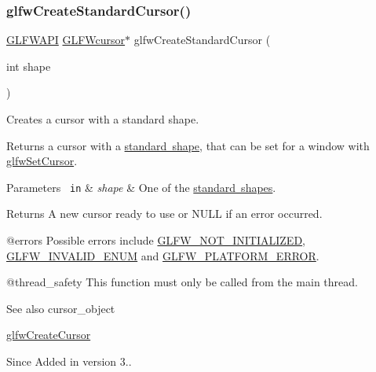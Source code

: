 \subsubsection{\texorpdfstring{glfwCreateStandardCursor()}{glfwCreateStandardCursor()}}
{\footnotesize\ttfamily \mbox{\hyperlink{glfw3_8h_a56da5036b2cc259351ae22fd6439bb47}{G\+L\+F\+W\+A\+PI}} \mbox{\hyperlink{glfw3_8h_a89261ae18c75e863aaf2656ecdd238f4}{G\+L\+F\+Wcursor}}$\ast$ glfw\+Create\+Standard\+Cursor (\begin{DoxyParamCaption}\item[{int}]{shape }\end{DoxyParamCaption})}



Creates a cursor with a standard shape. 

Returns a cursor with a \mbox{\hyperlink{group__shapes}{standard shape}}, that can be set for a window with \mbox{\hyperlink{group__input_gafaf103cea2f43530cff7de4e01126a4f}{glfw\+Set\+Cursor}}.


\begin{DoxyParams}[1]{Parameters}
\mbox{\texttt{ in}}  & {\em shape} & One of the \mbox{\hyperlink{group__shapes}{standard shapes}}. \\
\hline
\end{DoxyParams}
\begin{DoxyReturn}{Returns}
A new cursor ready to use or {\ttfamily N\+U\+LL} if an error occurred.
\end{DoxyReturn}
@errors Possible errors include \mbox{\hyperlink{group__errors_ga2374ee02c177f12e1fa76ff3ed15e14a}{G\+L\+F\+W\+\_\+\+N\+O\+T\+\_\+\+I\+N\+I\+T\+I\+A\+L\+I\+Z\+ED}}, \mbox{\hyperlink{group__errors_ga76f6bb9c4eea73db675f096b404593ce}{G\+L\+F\+W\+\_\+\+I\+N\+V\+A\+L\+I\+D\+\_\+\+E\+N\+UM}} and \mbox{\hyperlink{group__errors_gad44162d78100ea5e87cdd38426b8c7a1}{G\+L\+F\+W\+\_\+\+P\+L\+A\+T\+F\+O\+R\+M\+\_\+\+E\+R\+R\+OR}}.

@thread\+\_\+safety This function must only be called from the main thread.

\begin{DoxySeeAlso}{See also}
cursor\+\_\+object 

\mbox{\hyperlink{group__input_gac0f0f691f2d110f9acfb4bfe07f1216c}{glfw\+Create\+Cursor}}
\end{DoxySeeAlso}
\begin{DoxySince}{Since}
Added in version 3.. 
\end{DoxySince}
\mbox{\label{group__input_ga27556b7122117bc1bbb4bb3cc003ea43}} 
